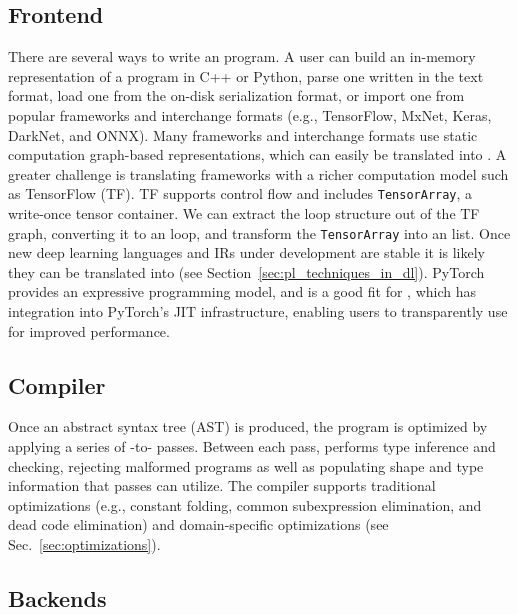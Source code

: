       \subsection*{Frontend}

      There are several ways to write an \relay program.
      A user can build an in-memory representation of
        a program in C++ or Python,
        parse one written in the \relay text format,
        load one from the on-disk serialization format,
        or import one from popular frameworks and interchange formats
          (e.g., TensorFlow, MxNet, Keras, DarkNet, and ONNX).
      Many frameworks and interchange formats use static computation graph-based representations,
        which can easily be translated into \relay.
      A greater challenge is translating frameworks
        with a richer computation model such as TensorFlow (TF).
      TF supports control flow and includes \verb|TensorArray|, a write-once
        tensor container.
      We can extract the loop structure out of the TF graph, converting
        it to an \relay loop, and transform the \verb|TensorArray| into an \relay list.
      Once new deep learning languages and IRs under development
        are stable it is likely they can be translated into \relay (see
        Section~\ref{sec:pl_techniques_in_dl}).
      PyTorch provides an expressive programming model, and is a good fit
        for \relay, which has integration into PyTorch's JIT infrastructure,
        enabling users to transparently use \relay for improved performance.

      \subsection*{Compiler}
      Once an \relay abstract syntax tree (AST) is produced,
        the program is optimized by applying a series of \relay-to-\relay
        passes.
      Between each pass, \relay performs type inference and checking,
        rejecting malformed programs as well as populating shape and type
        information that passes can utilize.
      The \relay compiler supports traditional optimizations
        (e.g., constant folding, common subexpression elimination, and dead code elimination)
        and domain-specific optimizations
        (see Sec.~\ref{sec:optimizations}).

      \subsection*{Backends}

